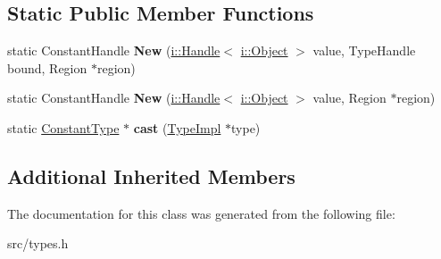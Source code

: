 \subsection*{Static Public Member Functions}
\begin{DoxyCompactItemize}
\item 
\hypertarget{classv8_1_1internal_1_1_type_impl_1_1_constant_type_abc1f2d93c5ceda8d11547da610d86c4a}{}static Constant\+Handle {\bfseries New} (\hyperlink{classv8_1_1internal_1_1_handle}{i\+::\+Handle}$<$ \hyperlink{classv8_1_1internal_1_1_object}{i\+::\+Object} $>$ value, Type\+Handle bound, Region $\ast$region)\label{classv8_1_1internal_1_1_type_impl_1_1_constant_type_abc1f2d93c5ceda8d11547da610d86c4a}

\item 
\hypertarget{classv8_1_1internal_1_1_type_impl_1_1_constant_type_a500122f35535539395bf59a3a0acb93b}{}static Constant\+Handle {\bfseries New} (\hyperlink{classv8_1_1internal_1_1_handle}{i\+::\+Handle}$<$ \hyperlink{classv8_1_1internal_1_1_object}{i\+::\+Object} $>$ value, Region $\ast$region)\label{classv8_1_1internal_1_1_type_impl_1_1_constant_type_a500122f35535539395bf59a3a0acb93b}

\item 
\hypertarget{classv8_1_1internal_1_1_type_impl_1_1_constant_type_aa446b5494e1edee16f650a00bf98117d}{}static \hyperlink{classv8_1_1internal_1_1_type_impl_1_1_constant_type}{Constant\+Type} $\ast$ {\bfseries cast} (\hyperlink{classv8_1_1internal_1_1_type_impl}{Type\+Impl} $\ast$type)\label{classv8_1_1internal_1_1_type_impl_1_1_constant_type_aa446b5494e1edee16f650a00bf98117d}

\end{DoxyCompactItemize}
\subsection*{Additional Inherited Members}


The documentation for this class was generated from the following file\+:\begin{DoxyCompactItemize}
\item 
src/types.\+h\end{DoxyCompactItemize}
